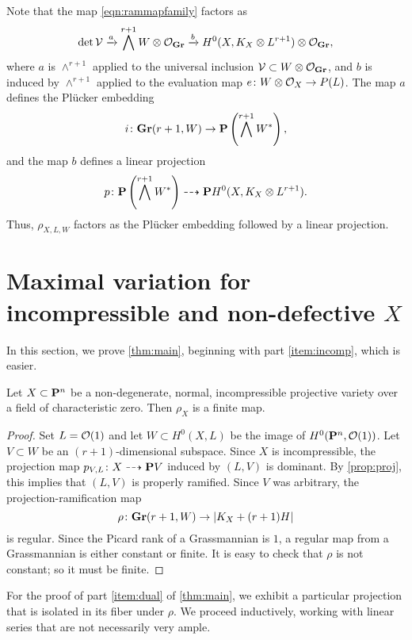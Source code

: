Note that the map \eqref{eqn:rammapfamily} factors as
\[ \det \mathcal V \xrightarrow{a} \bigwedge^{r+1} W \otimes \O_{\Gr} \xrightarrow{b} H^0(X, K_X \otimes L^{r+1}) \otimes \O_{\Gr},\]
where $a$ is $\wedge^{r+1}$ applied to the universal inclusion $\mathcal V \subset W \otimes \O_{\Gr}$, and $b$ is induced by $\wedge^{r+1}$ applied to the evaluation map $e \from W \otimes \O_{X} \to P(L)$.
The map $a$ defines the Pl\"ucker embedding
\[ i \from \Gr(r+1, W) \to \P \left(\bigwedge^{r+1}W^*\right),\]
and the map $b$ defines a linear projection
\[ p \from \P \left(\bigwedge^{r+1}W^*\right) \dashrightarrow \P H^0(X, K_X \otimes L^{r+1}).\]
Thus, $\rho_{X,L,W}$ factors as the Pl\"ucker embedding followed by a linear projection.

\section{Maximal variation for incompressible and non-defective $X$}
\label{sec:proof_of_theorem:main}
In this section, we prove \autoref{thm:main}, beginning with part \eqref{item:incomp}, which is easier.
\begin{proposition}
  \label{prop:incompress}
  Let $X \subset \P^n$ be a non-degenerate, normal, incompressible projective variety over a field of characteristic zero.
  Then $\rho_X$ is a finite map.
\end{proposition}
\begin{proof}
  Set $L = \O(1)$ and let $W \subset H^0(X, L)$ be the image of $H^0(\P^n, \O(1))$.
  Let $V \subset W$ be an $(r+1)$-dimensional subspace.
  Since $X$ is incompressible, the projection map $p_{V,L} \from X \dashrightarrow \P V$ induced by $(L, V)$ is dominant.
  By \autoref{prop:proj}, this implies that $(L, V)$ is properly ramified.
  Since $V$ was arbitrary, the projection-ramification map 
  \[ \rho \from \Gr(r+1, W) \to |K_X + (r+1) H|\]
  is regular.
  Since the Picard rank of a Grassmannian is $1$, a regular map from a Grassmannian is either constant or finite.
  It is easy to check that $\rho$ is not constant; so it must be finite.
\end{proof}

For the proof of part \eqref{item:dual} of \autoref{thm:main}, we exhibit a particular projection that is isolated in its fiber under $\rho$.
We proceed inductively, working with linear series that are not necessarily very ample.

